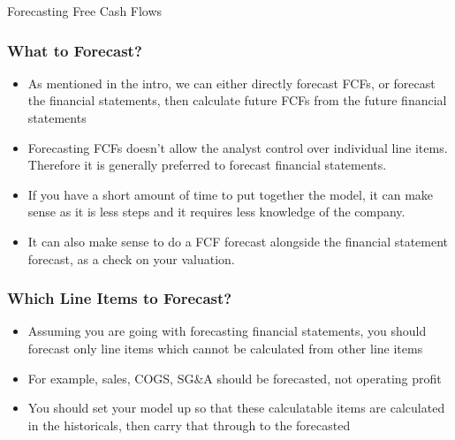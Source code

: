 \documentclass[handout, 11pt]{beamer}
\begin{document}
\begin{section}{Forecasting Free Cash Flows}
\begin{frame}
\frametitle{What to Forecast?}
\begin{itemize}
\item As mentioned in the intro, we can either directly forecast FCFs, or forecast the financial statements, then calculate future FCFs from the future financial statements
\vfill
\item Forecasting FCFs doesn't allow the analyst control over individual line items. Therefore it is generally preferred to forecast financial statements.
\vfill
\item If you have a short amount of time to put together the model, it can make sense as it is less steps and it requires less knowledge of the company.
\vfill
\item It can also make sense to do a FCF forecast alongside the financial statement forecast, as a check on your valuation.
\end{itemize}
\end{frame}
\begin{frame}
\frametitle{Which Line Items to Forecast?}
\begin{itemize}
\item Assuming you are going with forecasting financial statements, you should forecast only line items which cannot be calculated from other line items
\vfill
\item For example, sales, COGS, SG\&A should be forecasted, not operating profit
\vfill
\item You should set your model up so that these calculatable items are calculated in the historicals, then carry that through to the forecasted
\end{itemize}
\end{frame}
\end{section}
\end{document}
